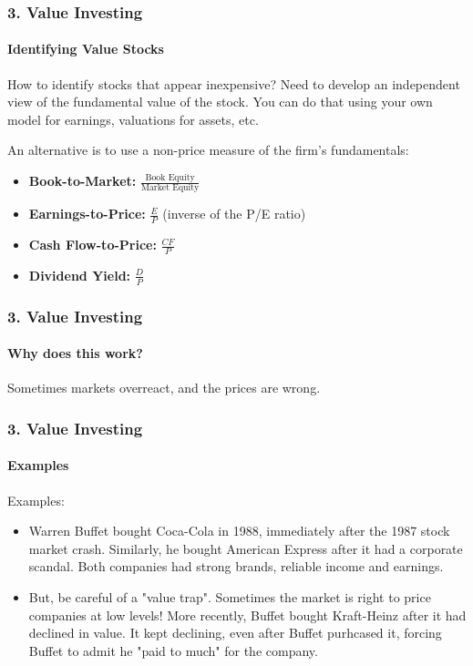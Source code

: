 \documentclass{beamer}
\begin{document}
\begin{frame}[t]
    \frametitle{3. Value Investing}
    \framesubtitle{Identifying Value Stocks}

    How to identify stocks that appear inexpensive?  Need to develop an independent view of the fundamental value of the stock.  You can do that using your own model for earnings, valuations for assets, etc.   
    \vspace{1em}

    An alternative is to use a non-price measure of the firm's fundamentals:

        \begin{itemize}
            \item \textbf{Book-to-Market:} $\displaystyle \frac{\text{Book Equity}}{\text{Market Equity}}$
            \item \textbf{Earnings-to-Price:} $\displaystyle \frac{E}{P}$ \qquad (inverse of the P/E ratio)
            \item \textbf{Cash Flow-to-Price:} $\displaystyle \frac{CF}{P}$
            \item \textbf{Dividend Yield:} $\displaystyle \frac{D}{P}$
        \end{itemize}

\end{frame}

\begin{frame}[t]
    \frametitle{3. Value Investing}
    \framesubtitle{Why does this work?}

    Sometimes markets overreact, and the prices are wrong.
    \vspace{1em}

    \vspace{1em}


    \vspace{1em}

\end{frame}

\begin{frame}[t]
    \frametitle{3. Value Investing}
    \framesubtitle{Examples}

    Examples:
    \begin{itemize}
    \item Warren Buffet bought Coca-Cola in 1988, immediately after the 1987 stock market crash. Similarly, he bought American Express after it had a corporate scandal. Both companies had strong brands, reliable income and earnings.
    \item But, be careful of a "value trap".  Sometimes the market is right to price companies at low levels!  More recently, Buffet bought Kraft-Heinz after it had declined in value.  It kept declining, even after Buffet purhcased it, forcing Buffet to admit he "paid to much" for the company.
    \end{itemize}

\end{frame}
\end{document}
